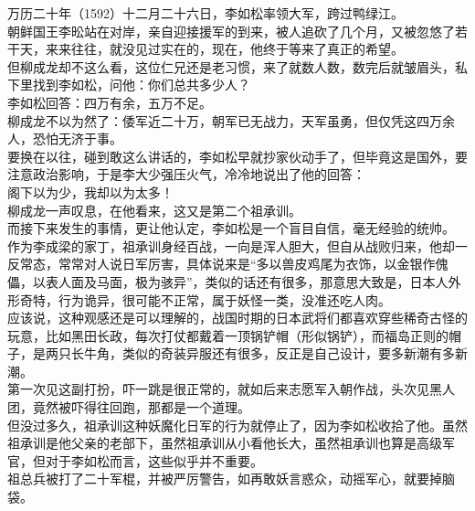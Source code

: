 \begin{multicols}{\theparacolNo}
万历二十年（1592）十二月二十六日，李如松率领大军，跨过鸭绿江。\\

朝鲜国王李昖站在对岸，亲自迎接援军的到来，被人追砍了几个月，又被忽悠了若干天，来来往往，就没见过实在的，现在，他终于等来了真正的希望。\\

但柳成龙却不这么看，这位仁兄还是老习惯，来了就数人数，数完后就皱眉头，私下里找到李如松，问他：你们总共多少人？\\

李如松回答：四万有余，五万不足。\\

柳成龙不以为然了：倭军近二十万，朝军已无战力，天军虽勇，但仅凭这四万余人，恐怕无济于事。\\

要换在以往，碰到敢这么讲话的，李如松早就抄家伙动手了，但毕竟这是国外，要注意政治影响，于是李大少强压火气，冷冷地说出了他的回答：\\

阁下以为少，我却以为太多！\\

柳成龙一声叹息，在他看来，这又是第二个祖承训。\\

而接下来发生的事情，更让他认定，李如松是一个盲目自信，毫无经验的统帅。\\

作为李成梁的家丁，祖承训身经百战，一向是浑人胆大，但自从战败归来，他却一反常态，常常对人说日军厉害，具体说来是“多以兽皮鸡尾为衣饰，以金银作傀儡，以表人面及马面，极为骇异”，类似的话还有很多，那意思大致是，日本人外形奇特，行为诡异，很可能不正常，属于妖怪一类，没准还吃人肉。\\

应该说，这种观感还是可以理解的，战国时期的日本武将们都喜欢穿些稀奇古怪的玩意，比如黑田长政，每次打仗都戴着一顶锅铲帽（形似锅铲），而福岛正则的帽子，是两只长牛角，类似的奇装异服还有很多，反正是自己设计，要多新潮有多新潮。\\

第一次见这副打扮，吓一跳是很正常的，就如后来志愿军入朝作战，头次见黑人团，竟然被吓得往回跑，那都是一个道理。\\

但没过多久，祖承训这种妖魔化日军的行为就停止了，因为李如松收拾了他。虽然祖承训是他父亲的老部下，虽然祖承训从小看他长大，虽然祖承训也算是高级军官，但对于李如松而言，这些似乎并不重要。\\

祖总兵被打了二十军棍，并被严厉警告，如再敢妖言惑众，动摇军心，就要掉脑袋。\\


\end{multicols}
